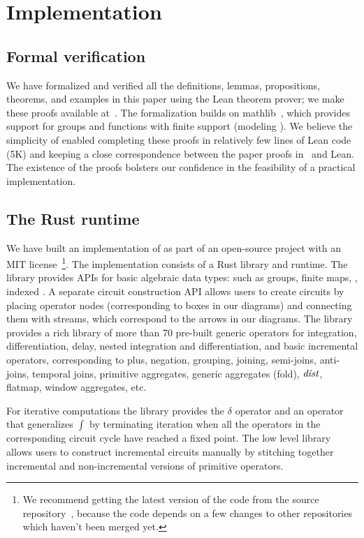 \section{Implementation}\label{sec:implementation}

\subsection{Formal verification}

We have formalized and verified all the definitions, lemmas,
propositions, theorems, and examples in this paper using the Lean
theorem prover; we make these proofs available at~\cite{dbsp-theory}.
The formalization builds on mathlib~\cite{mathlib2020}, which provides
support for groups and functions with finite support (modeling
\zrs). We believe the simplicity of \dbsp enabled completing these
proofs in relatively few lines of Lean code (5K) and keeping a close
correspondence between the paper proofs in~\cite{tr} and Lean.  The
existence of the proofs bolsters our confidence in the feasibility of
a practical implementation.

\subsection{The \dbsp Rust runtime}

We have built an implementation of \dbsp as part of an open-source
project with an MIT license~\cite{dbsp-crate}\footnote{We recommend
getting the latest version of the code from the source
repository~\cite{dbsp-repo}, because the code depends on a few changes
to other repositories which haven't been merged yet.}.  The
implementation consists of a Rust library and runtime.  The library
provides APIs for basic algebraic data types: such as groups, finite
maps, \zr, indexed \zr.  A separate circuit construction API allows
users to create \dbsp circuits by placing operator nodes
(corresponding to boxes in our diagrams) and connecting them with
streams, which correspond to the arrows in our diagrams.  The library
provides a rich library of more than 70 pre-built generic operators
for integration, differentiation, delay, nested integration and
differentiation, and basic \zr incremental operators, corresponding to
plus, negation, grouping, joining, semi-joins, anti-joins, temporal
joins, primitive aggregates, generic aggregates (fold), $\mathit{dist}$,
flatmap, window aggregates, etc.

For iterative computations the library provides the $\delta$ operator
and an operator that generalizes $\int$ by terminating iteration when
all the operators in the corresponding circuit cycle have reached a
fixed point.  The low level library allows users to construct
incremental circuits manually by stitching together incremental and
non-incremental versions of primitive operators.

